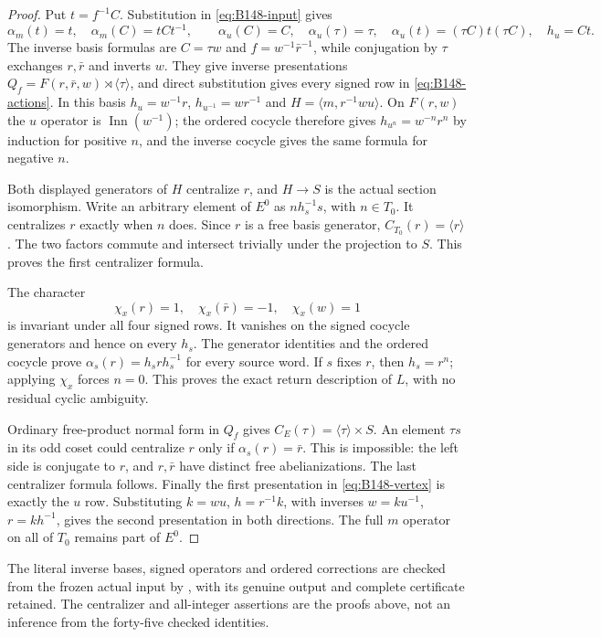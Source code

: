 \begin{proof}
Put $t=f^{-1}C$. Substitution in \eqref{eq:B148-input} gives
\[
 \alpha_m(t)=t,\quad\alpha_m(C)=tCt^{-1},\qquad
 \alpha_u(C)=C,\quad\alpha_u(\tau)=\tau,\quad
 \alpha_u(t)=(\tau C)t(\tau C),\quad h_u=Ct.
\]
The inverse basis formulas are $C=\tau w$ and
$f=w^{-1}\bar r^{-1}$, while conjugation by $\tau$ exchanges $r,\bar r$
and inverts $w$. They give inverse presentations
$Q_f=F(r,\bar r,w)\rtimes\langle\tau\rangle$, and direct substitution
gives every signed row in \eqref{eq:B148-actions}.
In this basis $h_u=w^{-1}r$, $h_{u^{-1}}=wr^{-1}$ and
$H=\langle m,r^{-1}wu\rangle$. On $F(r,w)$ the $u$ operator is
$\operatorname{Inn}(w^{-1})$; the ordered cocycle therefore gives
$h_{u^n}=w^{-n}r^n$ by induction for positive $n$, and the inverse
cocycle gives the same formula for negative $n$.

Both displayed generators of $H$ centralize $r$, and $H\to S$ is the
actual section isomorphism. Write an arbitrary element of $E^0$ as
$n h_s^{-1}s$, with $n\in T_0$. It centralizes $r$ exactly when $n$
does. Since $r$ is a free basis generator, $C_{T_0}(r)=\langle r\rangle$.
The two factors commute and intersect trivially under the projection to
$S$. This proves the first centralizer formula.

The character
\[
 \chi_x(r)=1,\quad\chi_x(\bar r)=-1,\quad\chi_x(w)=1
\]
is invariant under all four signed rows. It vanishes on the signed
cocycle generators and hence on every $h_s$. The generator identities
and the ordered cocycle prove
$\alpha_s(r)=h_srh_s^{-1}$ for every source word. If $s$ fixes $r$,
then $h_s=r^n$; applying $\chi_x$ forces $n=0$. This proves the exact
return description of $L$, with no residual cyclic ambiguity.

Ordinary free-product normal form in $Q_f$ gives
$C_E(\tau)=\langle\tau\rangle\times S$. An element $\tau s$ in its odd
coset could centralize $r$ only if $\alpha_s(r)=\bar r$. This is
impossible: the left side is conjugate to $r$, and $r,\bar r$ have
distinct free abelianizations. The last centralizer formula follows.
Finally the first presentation in \eqref{eq:B148-vertex} is exactly
the $u$ row. Substituting $k=wu$, $h=r^{-1}k$, with inverses
$w=ku^{-1}$, $r=kh^{-1}$, gives the second presentation in both
directions. The full $m$ operator on all of $T_0$ remains part of $E^0$.
\end{proof}
The literal inverse bases, signed operators and ordered corrections are
checked from the frozen actual input by
,
with its genuine output and complete certificate retained. The
centralizer and all-integer assertions are the proofs above, not an
inference from the forty-five checked identities.
